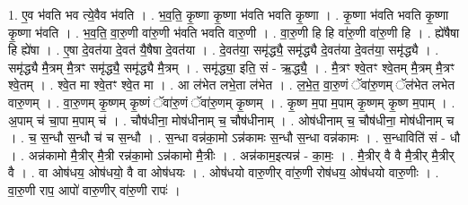 \documentclass[17pt]{extarticle}
\begin{document}
1. ए॒व भ॑वति भव त्ये॒वैव भ॑वति । . भ॒व॒ति॒ कृ॒ष्णा कृ॒ष्णा भ॑वति भवति कृ॒ष्णा । . कृ॒ष्णा भ॑वति भवति कृ॒ष्णा कृ॒ष्णा भ॑वति । . भ॒व॒ति॒ वा॒रु॒णी वा॑रु॒णी भ॑वति भवति वारु॒णी । . वा॒रु॒णी हि हि वा॑रु॒णी वा॑रु॒णी हि । . ह्ये॑षैषा हि ह्ये॑षा । . ए॒षा दे॒वत॑या दे॒वत॑ यै॒षैषा दे॒वत॑या । . दे॒वत॑या॒ समृ॑द्ध्यै॒ समृ॑द्ध्यै दे॒वत॑या दे॒वत॑या॒ समृ॑द्ध्यै । . समृ॑द्ध्यै मै॒त्रम् मै॒त्रꣳ समृ॑द्ध्यै॒ समृ॑द्ध्यै मै॒त्रम् । . समृ॑द्ध्या॒ इति॒ सं - ऋ॒द्ध्यै॒ । . मै॒त्रꣳ श्वे॒तꣳ श्वे॒तम् मै॒त्रम् मै॒त्रꣳ श्वे॒तम् । . श्वे॒त मा श्वे॒तꣳ श्वे॒त मा । . आ ल॑भेत लभे॒ता ल॑भेत । . ल॒भे॒त॒ वा॒रु॒णं ॅवा॑रु॒णम् ॅल॑भेत लभेत वारु॒णम् । . वा॒रु॒णम् कृ॒ष्णम् कृ॒ष्णं ॅवा॑रु॒णं ॅवा॑रु॒णम् कृ॒ष्णम् । . कृ॒ष्ण म॒पा म॒पाम् कृ॒ष्णम् कृ॒ष्ण म॒पाम् । . अ॒पाम् च॑ चा॒पा म॒पाम् च॑ । . चौष॑धीना॒ मोष॑धीनाम् च॒ चौष॑धीनाम् । . ओष॑धीनाम् च॒ चौष॑धीना॒ मोष॑धीनाम् च । . च॒ स॒न्धौ स॒न्धौ च॑ च स॒न्धौ । . स॒न्धा वन्न॑का॒मो ऽन्न॑कामः स॒न्धौ स॒न्धा वन्न॑कामः । . स॒न्धाविति॑ सं - धौ । . अन्न॑कामो मै॒त्रीर् मै॒त्री रन्न॑का॒मो ऽन्न॑कामो मै॒त्रीः । . अन्न॑काम॒इत्यन्न॑ - का॒मः॒ । . मै॒त्रीर् वै वै मै॒त्रीर् मै॒त्रीर् वै । . वा ओष॑धय॒ ओष॑धयो॒ वै वा ओष॑धयः । . ओष॑धयो वारु॒णीर् वा॑रु॒णी रोष॑धय॒ ओष॑धयो वारु॒णीः । . वा॒रु॒णी राप॒ आपो॑ वारु॒णीर् वा॑रु॒णी रापः॑ । \newline
\end{document}
